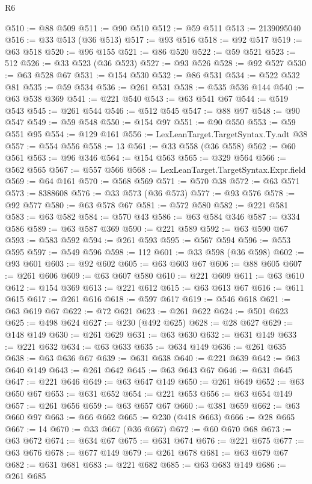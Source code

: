 \begin{lexlean}{R6}
\begin{coremodule}
@510 := @88 @509
@511 := @90 @510
@512 := @59 @511
@513 := 2139095040
@516 := @33 @513 (@36 @513)
@517 := @93 @516
@518 := @92 @517
@519 := @63 @518
@520 := @96 @155
@521 := @86 @520
@522 := @59 @521
@523 := 512
@526 := @33 @523 (@36 @523)
@527 := @93 @526
@528 := @92 @527
@530 := @63 @528 @67
@531 := @154 @530
@532 := @86 @531
@534 := @522 @532 @81
@535 := @59 @534
@536 := @261 @531
@538 := @535 @536 @144
@540 := @63 @538 @369
@541 := @221 @540
@543 := @63 @541 @67
@544 := @519 @543
@545 := @261 @544
@546 := @512 @545
@547 := @88 @97
@548 := @90 @547
@549 := @59 @548
@550 := @154 @97
@551 := @90 @550
@553 := @59 @551 @95
@554 := @129 @161
@556 := LexLeanTarget.TargetSyntax.Ty.adt @38
@557 := @554 @556
@558 := 13
@561 := @33 @558 (@36 @558)
@562 := @60 @561
@563 := @96 @346
@564 := @154 @563
@565 := @329 @564
@566 := @562 @565
@567 := @557 @566
@568 := LexLeanTarget.TargetSyntax.Expr.field
@569 := @64 @161
@570 := @568 @569
@571 := @570 @38
@572 := @63 @571
@573 := 8388608
@576 := @33 @573 (@36 @573)
@577 := @93 @576
@578 := @92 @577
@580 := @63 @578 @67
@581 := @572 @580
@582 := @221 @581
@583 := @63 @582
@584 := @570 @43
@586 := @63 @584 @346
@587 := @334 @586
@589 := @63 @587 @369
@590 := @221 @589
@592 := @63 @590 @67
@593 := @583 @592
@594 := @261 @593
@595 := @567 @594
@596 := @553 @595
@597 := @549 @596
@598 := 112
@601 := @33 @598 (@36 @598)
@602 := @93 @601
@603 := @92 @602
@605 := @63 @603 @67
@606 := @88 @605
@607 := @261 @606
@609 := @63 @607 @580
@610 := @221 @609
@611 := @63 @610
@612 := @154 @369
@613 := @221 @612
@615 := @63 @613 @67
@616 := @611 @615
@617 := @261 @616
@618 := @597 @617
@619 := @546 @618
@621 := @63 @619 @67
@622 := @72 @621
@623 := @261 @622
@624 := @501 @623
@625 := @498 @624
@627 := @230 (@492 @625)
@628 := @28 @627
@629 := @148 @149
@630 := @261 @629
@631 := @63 @630
@632 := @631 @149
@633 := @221 @632
@634 := @63 @633
@635 := @634 @149
@636 := @261 @635
@638 := @63 @636 @67
@639 := @631 @638
@640 := @221 @639
@642 := @63 @640 @149
@643 := @261 @642
@645 := @63 @643 @67
@646 := @631 @645
@647 := @221 @646
@649 := @63 @647 @149
@650 := @261 @649
@652 := @63 @650 @67
@653 := @631 @652
@654 := @221 @653
@656 := @63 @654 @149
@657 := @261 @656
@659 := @63 @657 @67
@660 := @381 @659
@662 := @63 @660 @97
@663 := @66 @662
@665 := @230 (@418 @663)
@666 := @28 @665
@667 := 14
@670 := @33 @667 (@36 @667)
@672 := @60 @670 @68
@673 := @63 @672
@674 := @634 @67
@675 := @631 @674
@676 := @221 @675
@677 := @63 @676
@678 := @677 @149
@679 := @261 @678
@681 := @63 @679 @67
@682 := @631 @681
@683 := @221 @682
@685 := @63 @683 @149
@686 := @261 @685

\end{coremodule}
\end{lexlean}
